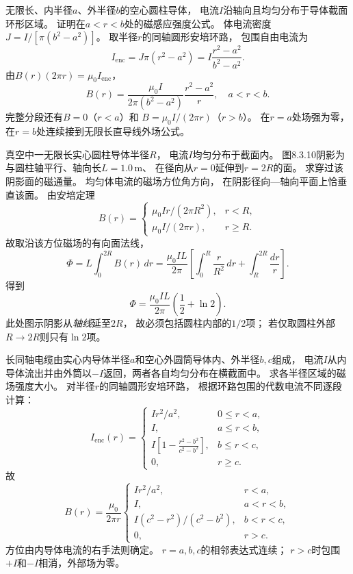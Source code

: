 \problemtext 无限长、内半径$a$、外半径$b$的空心圆柱导体，
电流$I$沿轴向且均匀分布于导体截面环形区域。
证明在$a<r<b$处的磁感应强度公式。
\workings
体电流密度
$J=I/[\pi(b^2-a^2)]$。
取半径$r$的同轴圆形安培环路，
包围自由电流为
\[
I_{\mathrm{enc}}=J\pi(r^2-a^2)
=I\frac{r^2-a^2}{b^2-a^2}.
\]
由$B(r)(2\pi r)=\mu_0I_{\mathrm{enc}}$，
\[
\boxed{B(r)=\frac{\mu_0I}{2\pi(b^2-a^2)}
\frac{r^2-a^2}{r}},\quad a<r<b.
\]
完整分段还有$B=0$（$r<a$）和
$B=\mu_0I/(2\pi r)$（$r>b$）。
\crosscheck 在$r=a$处场强为零，在$r=b$处连续接到无限长直导线外场公式。

\problemtext 真空中一无限长实心圆柱导体半径$R$，
电流$I$均匀分布于截面内。
图8.3.10阴影为与圆柱轴平行、轴向长$L=1.0\,\mathrm m$、
在径向从$r=0$延伸到$r=2R$的面。
求穿过该阴影面的磁通量。
\workings
均匀体电流的磁场方位角方向，
在阴影径向—轴向平面上恰垂直该面。
由安培定理
\[
B(r)=
\begin{cases}
\mu_0Ir/(2\pi R^2),&r<R,\\
\mu_0I/(2\pi r),&r\ge R.
\end{cases}
\]
故取沿该方位磁场的有向面法线，
\[
\Phi=L\int_0^{2R}B(r)\,dr
=\frac{\mu_0IL}{2\pi}
\left[\int_0^R\frac r{R^2}\,dr+
\int_R^{2R}\frac{dr}{r}\right].
\]
得到
\[
\boxed{\Phi=\frac{\mu_0IL}{2\pi}
\left(\frac12+\ln2\right)}.
\]
\crosscheck 此处图示阴影从\emph{轴线}延至$2R$，
故必须包括圆柱内部的$1/2$项；
若仅取圆柱外部$R\to2R$则只有$\ln2$项。

\problemtext 长同轴电缆由实心内导体半径$a$和空心外圆筒导体内、外半径$b,c$组成，
电流$I$从内导体流出并由外筒以$-I$返回，两者各自均匀分布在横截面中。
求各半径区域的磁场强度大小。
\workings
对半径$r$的同轴圆形安培环路，
根据环路包围的代数电流不同逐段计算：
\[
I_{\mathrm{enc}}(r)=
\begin{cases}
I r^2/a^2,&0\le r<a,\\
I,&a\le r<b,\\
I\left[1-\frac{r^2-b^2}{c^2-b^2}\right],&b\le r<c,\\
0,&r\ge c.
\end{cases}
\]
故
\[
\boxed{B(r)=\frac{\mu_0}{2\pi r}
\begin{cases}
I r^2/a^2,&r<a,\\
I,&a<r<b,\\
I(c^2-r^2)/(c^2-b^2),&b<r<c,\\
0,&r>c.
\end{cases}}
\]
方位由内导体电流的右手法则确定。
\crosscheck $r=a,b,c$的相邻表达式连续；
$r>c$时包围$+I$和$-I$相消，外部场为零。

